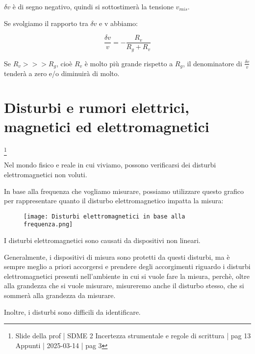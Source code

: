 $\delta v$ è di segno negativo, quindi si sottostimerà la tensione $v_{mis}$. \newline 

Se svolgiamo il rapporto tra $\delta v$ e v abbiamo: 

{
    \Large 
    \begin{equation}
        \frac{\delta v}{v}
        = 
        - \frac{R_v}{R_g + R_v}
    \end{equation}
}

Se $R_v >>> R_g$, cioè $R_v$ è molto più grande rispetto a $R_g$, 
il denominatore di $\frac{\delta v}{v}$ tenderà a zero e/o diminuirà di molto. \newline 

\newpage 

\section{Disturbi e rumori elettrici, magnetici ed elettromagnetici}
\footnote{Slide della prof | SDME 2 Incertezza strumentale e regole di scrittura | pag 13 \\  
Appunti | 2025-03-14 | pag 3}

Nel mondo fisico e reale in cui viviamo, possono verificarsi dei disturbi elettromagnetici non voluti. \newline 

In base alla frequenza che vogliamo misurare, possiamo utilizzare questo grafico per rappresentare 
quanto il disturbo elettromagnetico impatta la misura: 

\begin{figure}[h]
    \centering
    \texttt{[image: Disturbi elettromagnetici in base alla frequenza.png]}
\end{figure}

I disturbi elettromagnetici sono causati da dispositivi non lineari. \newline 

Generalmente, i dispositivi di misura sono protetti da questi disturbi, ma è sempre meglio a priori accorgersi 
e prendere degli accorgimenti riguardo i disturbi elettromagnetici presenti nell'ambiente in cui si vuole fare la misura, 
perchè, oltre alla grandezza che si vuole misurare, misureremo anche il disturbo stesso, che si sommerà alla grandezza da misurare. \newline 

Inoltre, i disturbi sono difficili da identificare. \newline 

